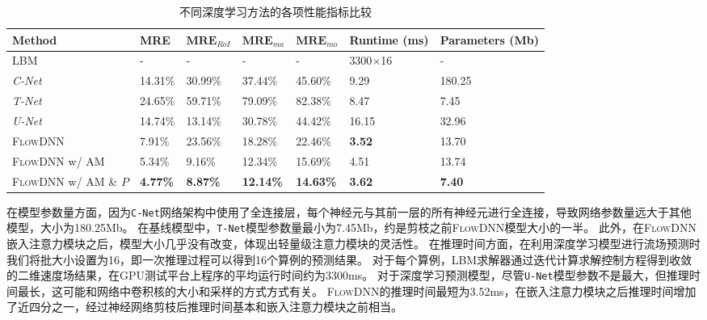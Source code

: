 \begin{table}[htp]
	\caption{不同深度学习方法的各项性能指标比较}
	
	\label{tab:all_comp}
	\centering
	
	\begin{tabular}{p{3.5cm}p{1.1cm}p{1.3cm}p{1.2cm}p{1.2cm}p{1.2cm}p{1.5cm}}
		\toprule
		\textbf{Method}  & \textbf{MRE} &  ${\textbf{MRE}_{RoI}}$ & $\textbf{MRE}_{ma}$ & $\textbf{MRE}_{mo}$ & \textbf{Runtime (ms)} & \textbf{Parameters (Mb)}\\
		\midrule
		LBM 				&	- &	-&	-&	-		&  3300$\times$16 	& -\\
		\textit{C-Net}   &	14.31\%&	30.99\% &	37.44\%&	45.60\%	&9.29    	& 180.25\\
		\textit{T-Net}   		&	24.65\%&	59.71\%&	79.09\%&	82.38\%	&  8.47 	& 7.45   \\
		\textit{U-Net}   &	14.74\%&	13.14\%&	30.78\%&	44.42\%	& 16.15      	&  32.96 \\
		\textsc{FlowDNN}   		&	7.91\%&	23.56\%& 18.28\%&	22.46\%	& \textbf{3.52}	& 13.70   \\
		\textsc{FlowDNN} w/ AM   		&5.34\% &9.16\% & 12.34\% & 15.69\%  & 4.51   	& 13.74   \\
		\textsc{FlowDNN} w/ AM \& $P$		&\textbf{4.77\%} &\textbf{8.87\%}&\textbf{12.14\%}&\textbf{14.63\%}  & \textbf{3.62}   	& \textbf{7.40}   \\
		\bottomrule
	\end{tabular}
	
\end{table}

在模型参数量方面，因为\texttt{C-Net}网络架构中使用了全连接层，每个神经元与其前一层的所有神经元进行全连接，导致网络参数量远大于其他模型，大小为180.25Mb。
在基线模型中，\texttt{T-Net}模型参数量最小为7.45Mb，约是剪枝之前\textsc{FlowDNN}模型大小的一半。
此外，在\textsc{FlowDNN}嵌入注意力模块之后，模型大小几乎没有改变，体现出轻量级注意力模块的灵活性。
在推理时间方面，在利用深度学习模型进行流场预测时我们将批大小设置为16，即一次推理过程可以得到16个算例的预测结果。
对于每个算例，LBM求解器通过迭代计算求解控制方程得到收敛的二维速度场结果，在GPU测试平台上程序的平均运行时间约为3300ms。
对于深度学习预测模型，尽管\texttt{U-Net}模型参数不是最大，但推理时间最长，这可能和网络中卷积核的大小和采样的方式方式有关。
\textsc{FlowDNN}的推理时间最短为3.52ms，在嵌入注意力模块之后推理时间增加了近四分之一，经过神经网络剪枝后推理时间基本和嵌入注意力模块之前相当。

